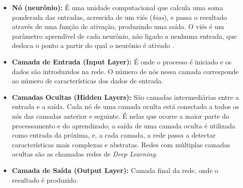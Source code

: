 \begin{itemize}
    \item \textbf{Nó (neurônio):} É uma unidade computacional que calcula uma soma ponderada das entradas, acrescida de um viés (\textit{bias}), e passa o resultado através de uma função de ativação, produzindo uma saída. O viés é um parâmetro aprendível de cada neurônio, não ligado a nenhuma entrada, que desloca o ponto a partir do qual o neurônio é ativado \cite{NielsenNNDL2015}.
    \item \textbf{Camada de Entrada (Input Layer):} É onde o processo é iniciado e os dados são introduzidos na rede. O número de nós nessa camada corresponde ao número de características dos dados de entrada.
    \item \textbf{Camadas Ocultas (Hidden Layers):} São camadas intermediárias entre a entrada e a saída. Cada nó de uma camada oculta está conectado a todos os nós das camadas anterior e seguinte. É nelas que ocorre a maior parte do processamento e do aprendizado; a saída de uma camada oculta é utilizada como entrada da próxima, e, a cada camada, a rede passa a detectar características mais complexas e abstratas. Redes com múltiplas camadas ocultas são as chamadas redes de \textit{Deep Learning}.
    \item \textbf{Camada de Saída (Output Layer):} Camada final da rede, onde o resultado é produzido.
\end{itemize}



